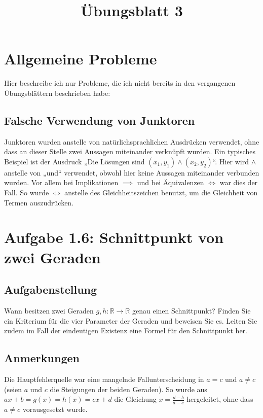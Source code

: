 \documentclass[a4paper]{article}
\title{Übungsblatt 3}
\date{}
\newcommand*{\R}{\mathbb R}
\begin{document}
\maketitle

\section{Allgemeine Probleme}

Hier beschreibe ich nur Probleme, die ich nicht bereits in den vergangenen Übungsblättern beschrieben habe:

\subsection{Falsche Verwendung von Junktoren}

Junktoren wurden anstelle von natürlichsprachlichen Ausdrücken verwendet, ohne dass an dieser Stelle zwei Aussagen miteinander verknüpft wurden. Ein typisches Beispiel ist der Ausdruck „Die Lösungen sind $(x_1,y_1) \land (x_2,y_2)$“. Hier wird $\land$ anstelle von „und“ verwendet, obwohl hier keine Aussagen miteinander verbunden wurden. Vor allem bei Implikationen $\implies$ und bei Äquivalenzen $\iff$ war dies der Fall. So wurde $\iff$ anstelle des Gleichheitszeichen benutzt, um die Gleichheit von Termen auszudrücken.

\section{Aufgabe 1.6: Schnittpunkt von zwei Geraden}

\subsection{Aufgabenstellung}

Wann besitzen zwei Geraden $g,h:\R\to\R$ genau einen Schnittpunkt? Finden Sie ein Kriterium für die vier Parameter der Geraden und beweisen Sie es. Leiten Sie zudem im Fall der eindeutigen Existenz eine Formel für den Schnittpunkt her.

\subsection{Anmerkungen}

Die Hauptfehlerquelle war eine mangelnde Fallunterscheidung in $a=c$ und $a\neq c$ (seien $a$ und $c$ die Steigungen der beiden Geraden). So wurde aus $ax+b=g(x)=h(x)=cx+d$ die Gleichung $x=\frac{d-b}{a-c}$ hergeleitet, ohne dass $a\neq c$ vorausgesetzt wurde.
\end{document}
